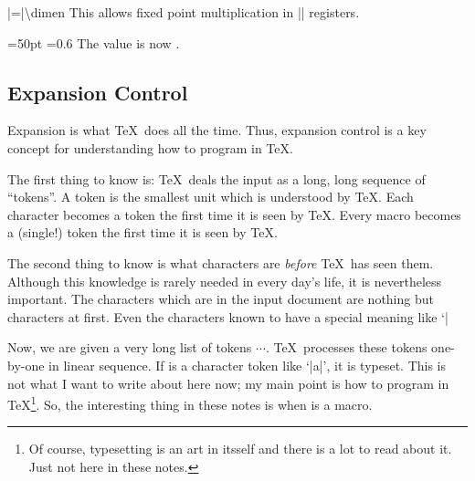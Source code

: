 \begin{command}{\dimen{}|=|\textbackslash dimen}
	This allows fixed point multiplication in |\dimen| registers.
\begin{codeexample}[]
=50pt
=0.6
The value is now \the{}.
\end{codeexample}
\end{command}


\subsection{Expansion Control}
\label{sec:expansion:control}
Expansion is what \TeX\ does all the time. Thus, expansion control is a key concept for understanding how to program in \TeX.

The first thing to know is: \TeX\ deals the input as a long, long sequence of ``tokens''. A token is the smallest unit which is understood by \TeX. Each character becomes a token the first time it is seen by \TeX. Every macro becomes a (single!) token the first time it is seen by \TeX.

The second thing to know is what characters are \emph{before} \TeX\ has seen them. Although this knowledge is rarely needed in every day's life, it is nevertheless important. The characters which are in the input document are nothing but characters at first. Even the characters known to have a special meaning like `|%

Now, we are given a very long list of tokens $\cdots$. \TeX\ processes these tokens one-by-one in linear sequence. If  is a character token like `|a|', it is typeset. This is not what I want to write about here now; my main point is how to program in \TeX\footnote{Of course, typesetting is an art in itsself and there is a lot to read about it. Just not here in these notes.}. So, the interesting thing in these notes is when  is a macro.

